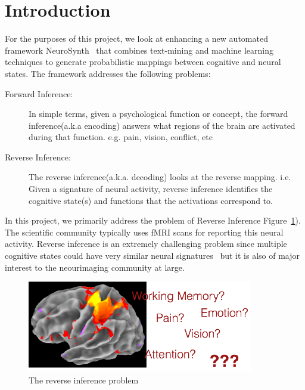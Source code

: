 \documentclass{article} %
\begin{document}
\section{Introduction}
For the purposes of this project, we look at enhancing a new automated framework NeuroSynth~\cite{yarkoni2011large}  that combines text-mining and machine learning techniques to generate probabilistic mappings between cognitive and neural states. The framework addresses the following problems:
\begin{description}
\item[Forward Inference: ] In simple terms, given a psychological function or concept, the forward inference(a.k.a encoding) answers what regions of the brain are activated during that function. e.g. pain, vision, conflict, etc
\item[Reverse Inference: ] The reverse inference(a.k.a. decoding) looks at the reverse mapping. i.e. Given a signature of neural activity, reverse inference identifies the cognitive state(s) and functions that the activations correspond to.
\end{description}
In this project, %
we primarily address the problem of Reverse Inference Figure~\ref{fig:revinf}). The scientific community typically uses fMRI scans for reporting this neural activity. Reverse inference is an extremely challenging problem since multiple cognitive states could have very similar neural signatures~\cite{yarkoni2011large} but it is also of major interest to the neourimaging community at large.

\begin{figure}[h]
\begin{center}
\includegraphics[height=4cm]{revinf.png}
\end{center}
\caption{The reverse inference problem}
\label{fig:revinf}
\end{figure}
\end{document}
